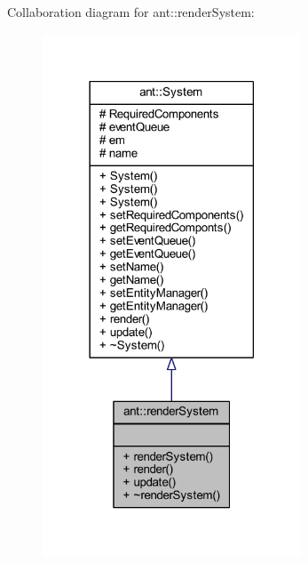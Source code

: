 Collaboration diagram for ant\+:\+:render\+System\+:
\nopagebreak
\begin{figure}[H]
\begin{center}
\leavevmode
\includegraphics[width=218pt]{d2/d4f/classant_1_1render_system__coll__graph}
\end{center}
\end{figure}
